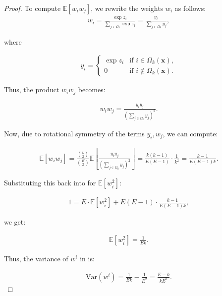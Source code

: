 \begin{proof}
To compute \( \mathbb{E}[w_i w_j] \), we rewrite the weights \( w_i \) as follows:
\begin{align}
w_i = \frac{\exp z_i}{\sum_{j \in \Omega_k} \exp z_j} = \frac{y_i}{\sum_{j \in \Omega_k} y_j},
\end{align}

where

\begin{align}
y_i = 
\begin{cases} 
\exp z_i & \text{if } i \in \Omega_k(\mathbf{x}), \\
0 & \text{if } i \notin \Omega_k(\mathbf{x}).
\end{cases}
\end{align}

Thus, the product \( w_i w_j \) becomes:

\begin{align}
w_i w_j = \frac{y_i y_j}{\left( \sum_{j \in \Omega_k} y_j \right)^2}.
\end{align}

Now, due to rotational symmetry of the terms \( y_i, w_j \), we can compute:

\begin{align}
\mathbb{E}[w_i w_j] = \frac{{k \choose 2}}{{E \choose 2}} \mathbb{E}\left[\frac{y_i y_j}{\left( \sum_{j \in \Omega_k} y_j \right)^2}\right] = \frac{k(k-1)}{E(E-1)} \cdot \frac{1}{k^2} = \frac{k-1}{E(E-1)k}.
\end{align}

Substituting this back into  for \( \mathbb{E}[w_i^2] \):

\begin{align}
1 = E \cdot \mathbb{E}[w_i^2] + E(E-1) \cdot \frac{k-1}{E(E-1)k},
\end{align}

we get:

\begin{align}
\mathbb{E}[w_i^2] = \frac{1}{Ek}.
\end{align}

Thus, the variance of \( w^i \) in  is:

\begin{align}
\text{Var}(w^i) = \frac{1}{Ek} - \frac{1}{E^2} = \frac{E-k}{kE^2}.
\end{align}

\end{proof}

